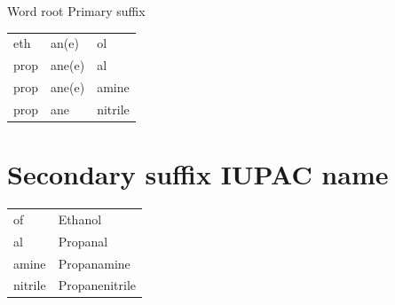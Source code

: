 \documentclass[10pt]{article}
\begin{document}
Word root Primary suffix

\begin{center}
\begin{tabular}{lll}
eth & an(e) & ol \\
prop & ane(e) & al \\
prop & ane(e) & amine \\
prop & ane & nitrile \\
\end{tabular}
\end{center}

\section*{Secondary suffix IUPAC name}
\begin{center}
\begin{tabular}{ll}
of & Ethanol \\
al & Propanal \\
amine & Propanamine \\
nitrile & Propanenitrile \\
\end{tabular}
\end{center}
\end{document}

